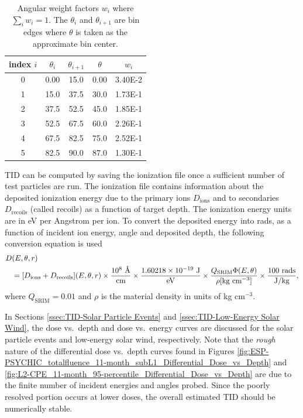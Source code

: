 \documentclass{hitec}
\newcommand{\angstrom}{\mbox{\normalfont\AA}}
\begin{document}
\begin{table}[h]\centering
	\caption{Angular weight factors $w_i$ where $\sum_i w_i = 1$. The $\theta_i$ and $\theta_{i+1}$ are bin edges where $\theta$ is taken as the approximate bin center.}\label{tab:incidentAngleBins}
	\begin{tabular}{|c | c | c | c | c |}\hline
		index $i$ & $\theta_i$ & $\theta_{i+1}$ & $\theta$ & $w_i$ \\\hline
		0  & 0.00 & 15.0 & 0.00 & 3.40E-2 \\\hline
		1  & 15.0 & 37.5 & 30.0 & 1.73E-1 \\\hline
		2  & 37.5 & 52.5 & 45.0 & 1.85E-1\\\hline
		3  & 52.5 & 67.5 & 60.0 & 2.26E-1 \\\hline
		4  & 67.5 & 82.5 & 75.0 & 2.52E-1\\\hline
		5  & 82.5 & 90.0 & 87.0 & 1.30E-1\\\hline
	\end{tabular}
\end{table}

TID can be computed by saving the ionization file once a sufficient number of test particles are run. The ionization file contains information about the deposited ionization energy due to the primary ions $D_{\text{ions}}$ and to secondaries $D_{\text{recoils}}$ (called recoils) as a function of target depth. The ionization energy units are in eV per Angstrom per ion. To convert the deposited energy into rads, as a function of incident ion energy, angle and deposited depth, the following conversion equation is used
\begin{align}\label{eq:Edep_to_dose}
	D\nonumber&(E,\theta,r)\\&= [D_{\text{ions}} + D_{\text{recoils}}](E,\theta,r) \times \frac{10^8 \text{ \si{\angstrom}}}{\text{cm}} \times \frac{1.60218\times 10^{-19} \text{ J}}{\text{eV}} \times \frac{Q_{\text{SRIM}}\Phi(E,\theta)}{\rho[\text{kg cm$^{-3}$}]}\times \frac{100 \text{ rads}}{\text{J/kg}} ,
\end{align}
where $Q_{\text{SRIM}} = 0.01$ and $\rho$ is the material density in units of kg cm$^{-3}$.

In Sections \ref{ssec:TID-Solar Particle Events} and \ref{ssec:TID-Low-Energy Solar Wind}, the dose vs.\ depth and dose vs.\ energy curves are discussed for the solar particle events and low-energy solar wind, respectively. Note that the \textit{rough} nature of the differential dose vs.\ depth curves found in Figures \ref{fig:ESP-PSYCHIC_totalfluence_11-month_subL1_Differential_Dose_vs_Depth} and \ref{fig:L2-CPE_11-month_95-percentile_Differential_Dose_vs_Depth} are due to the finite number of incident energies and angles probed. Since the poorly resolved portion occurs at lower doses, the overall estimated TID should be numerically stable.
\end{document}
